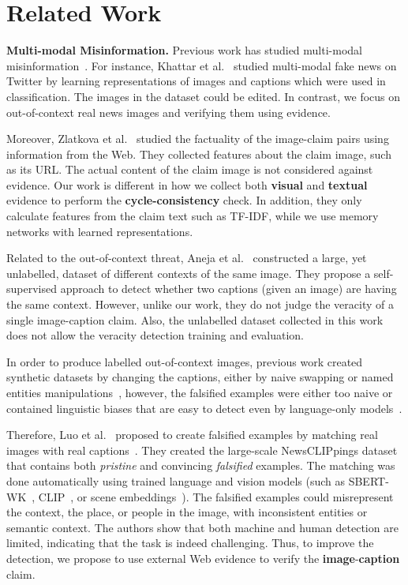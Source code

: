 \section{Related Work}
\textbf{Multi-modal Misinformation.}
Previous work has studied multi-modal misinformation~\cite{wang2018eann,khattar2019mvae,nakamura2020fakeddit}. For instance, Khattar et al.~\cite{khattar2019mvae} studied multi-modal fake news on Twitter by learning representations of images and captions which were used in classification. The images in the dataset could be edited. 
In contrast, we focus on out-of-context real news images and verifying them using evidence. 

Moreover, Zlatkova et al.~\cite{zlatkova2019fact} studied the factuality of the image-claim pairs using information from the Web. They collected features about the claim image, such as its URL. The actual content of the claim image is not considered against evidence. Our work is different in how we collect both \textbf{\textcolor{myOrange}{visual}} and \textbf{\textcolor{myblue}{textual}} evidence to perform the \textbf{cycle-consistency} check. In addition, they only calculate features from the claim text such as TF-IDF, while we use memory networks with learned representations. 

Related to the out-of-context threat, Aneja et al.~\cite{aneja2021catching} constructed a large, yet unlabelled, dataset of different contexts of the same image. They propose a self-supervised approach to detect whether two captions (given an image) are having the same context. However, unlike our work, they do not judge the veracity of a single image-caption claim. Also, the unlabelled dataset collected in this work does not allow the veracity detection training and evaluation. 

In order to produce labelled out-of-context images, previous work created synthetic datasets by changing the captions, either by naive swapping or named entities manipulations~\cite{jaiswal2017multimedia,sabir2018deep}, however, the falsified examples were either too naive 
or contained linguistic biases that are easy to detect even by language-only models~\cite{luo2021newsclippings}. 

Therefore, Luo et al.~\cite{luo2021newsclippings} proposed to create falsified examples by matching real images with real captions~\cite{liu2020visualnews}. They created the large-scale NewsCLIPpings dataset that contains both \textit{pristine} and convincing \textit{falsified} examples. The matching was done automatically using trained language and vision models (such as SBERT-WK~\cite{wang2020sbert}, CLIP~\cite{radford2021learning}, or scene embeddings~\cite{zhou2017places}). The falsified examples could misrepresent the context, the place, or people in the image, with inconsistent entities or semantic context. The authors show that both machine and human detection are limited, indicating that the task is indeed challenging. 
Thus, to improve the detection, we propose to use external Web evidence to verify the \textbf{\textcolor{myOrange}{image}}-\textbf{\textcolor{myblue}{caption}} claim.

